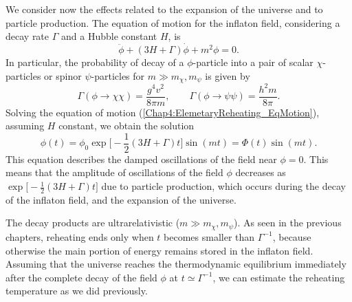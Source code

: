 \documentclass[11pt,a4paper,twoside]{book}
\begin{document}
We consider now the effects related to the expansion of the universe and to particle production. The equation of motion for the inflaton field, considering a decay rate $ \Gamma $ and a Hubble constant $ H $, is
\begin{equation}
	\label{Chap4:ElemetaryReheating_EqMotion}
	\ddot{\phi} + (3H + \Gamma)\dot{\phi} + m^{2}\phi = 0.
\end{equation}
 In particular, the probability of decay of a $ \phi $-particle into a pair of scalar $ \chi $-particles or spinor $ \psi $-particles for $ m \gg m_{\chi},m_{\psi} $ is given by \cite{Chap4:LindePreheatingModel}
\begin{equation}
	\label{Chap4:ElemReheating_DecayRate}
	\Gamma(\phi \rightarrow \chi \chi) = \frac{g^{4}v^{2}}{8\pi m},
	\qquad
	\Gamma(\phi \rightarrow \psi \psi) = \frac{h^{2}m}{8\pi}.
\end{equation}
Solving the equation of motion (\ref{Chap4:ElemetaryReheating_EqMotion}), assuming $ H $ constant, we obtain the solution
\begin{equation}
	\label{Chap4:ElemReheating_solution}
	\phi(t)=\phi_{0}\exp\Big[-\frac{1}{2}(3H+\Gamma)t\Big]\sin(mt)=\Phi(t)\sin(mt).
\end{equation}
 This equation describes the damped oscillations of the field near $ \phi=0 $. This means that the amplitude of oscillations of the field $\phi$ decreases as $ \exp\Big[-\frac{1}{2}(3H+\Gamma)t\Big] $ due to particle production, which occurs during the decay of the inflaton field, and the expansion of the universe.

The decay products are ultrarelativistic ($ m \gg m_{\chi},m_{\psi} $). As seen in the previous chapters, reheating ends only when $ t $ becomes smaller than $\Gamma^{-1}$, because otherwise the main portion of energy remains stored in the inflaton field. Assuming that the universe reaches the thermodynamic equilibrium immediately after the complete decay of the field $ \phi $ at $ t \simeq \Gamma^{-1} $, we can estimate the reheating temperature as we did previously. 
\end{document}
